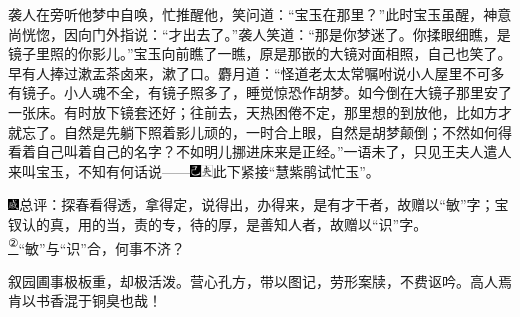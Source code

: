 袭人在旁听他梦中自唤，忙推醒他，笑问道：``宝玉在那里？''此时宝玉虽醒，神意尚恍惚，因向门外指说：``才出去了。''袭人笑道：``那是你梦迷了。你揉眼细瞧，是镜子里照的你影儿。''宝玉向前瞧了一瞧，原是那嵌的大镜对面相照，自己也笑了。早有人捧过漱盂茶卤来，漱了口。麝月道：``怪道老太太常嘱咐说小人屋里不可多有镜子。小人魂不全，有镜子照多了，睡觉惊恐作胡梦。如今倒在大镜子那里安了一张床。有时放下镜套还好；往前去，天热困倦不定，那里想的到放他，比如方才就忘了。自然是先躺下照着影儿顽的，一时合上眼，自然是胡梦颠倒；不然如何得看着自己叫着自己的名字？不如明儿挪进床来是正经。''一语未了，只见王夫人遣人来叫宝玉，不知有何话说------{\includegraphics[width=3mm]{../Images/00003}\includegraphics[width=3mm]{../Images/00012}\footnotesize \kaishu 此下紧接``慧紫鹃试忙玉''。}

{\includegraphics[width=3mm]{../Images/00005}总评：探春看得透，拿得定，说得出，办得来，是有才干者，故赠以``敏''字；宝钗认的真，用的当，责的专，待的厚，是善知人者，故赠以``识''字。}\href{../Text/part0060_split_000.html\#lnkback_2_a}{\textsuperscript{②}}{``敏''与``识''合，何事不济？}

{叙园圃事极板重，却极活泼。营心孔方，带以图记，劳形案牍，不费讴吟。高人焉肯以书香混于铜臭也哉！}


